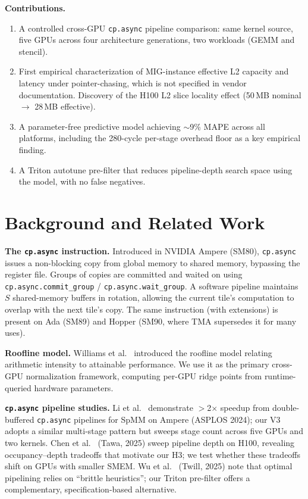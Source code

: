 \documentclass[sigplan,nonacm,10pt]{acmart}
\newcommand{\cpasync}{\texttt{cp.async}}
\begin{document}
\textbf{Contributions.}
\begin{enumerate}
\item A controlled cross-GPU \cpasync{} pipeline comparison: same
  kernel source, five GPUs across four architecture generations, two
  workloads (GEMM and stencil).
\item First empirical characterization of MIG-instance effective L2
  capacity and latency under pointer-chasing, which is not specified in
  vendor documentation. Discovery of the H100 L2 slice locality effect
  (50\,MB nominal $\to$ 28\,MB effective).
\item A parameter-free predictive model achieving $\sim$9\% MAPE across
  all platforms, including the 280-cycle per-stage overhead floor as a
  key empirical finding.
\item A Triton autotune pre-filter that reduces pipeline-depth search
  space using the model, with no false negatives.
\end{enumerate}

\section{Background and Related Work}
\label{sec:related}

\textbf{The \cpasync{} instruction.}
Introduced in NVIDIA Ampere (SM80), \cpasync{} issues a non-blocking
copy from global memory to shared memory, bypassing the register file.
Groups of copies are committed and waited on using
\texttt{cp.async.commit\_group} / \texttt{cp.async.wait\_group}.
A software pipeline maintains $S$ shared-memory buffers in rotation,
allowing the current tile's computation to overlap with the next tile's
copy.
The same instruction (with extensions) is present on Ada (SM89) and
Hopper (SM90, where TMA supersedes it for many uses).

\textbf{Roofline model.}
Williams et al.~\cite{roofline} introduced the roofline model relating
arithmetic intensity to attainable performance.
We use it as the primary cross-GPU normalization framework, computing
per-GPU ridge points from runtime-queried hardware parameters.

\textbf{\cpasync{} pipeline studies.}
Li et al.~\cite{dtcspmm} demonstrate $>$2$\times$ speedup from
double-buffered \cpasync{} pipelines for SpMM on Ampere (ASPLOS 2024);
our V3 adopts a similar multi-stage pattern but sweeps stage count
across five GPUs and two kernels.
Chen et al.~\cite{tawa} (Tawa, 2025) sweep pipeline depth on H100,
revealing occupancy--depth tradeoffs that motivate our H3;
we test whether these tradeoffs shift on GPUs with smaller SMEM.
Wu et al.~\cite{twill} (Twill, 2025) note that optimal pipelining
relies on ``brittle heuristics''; our Triton pre-filter offers a
complementary, specification-based alternative.
\end{document}
